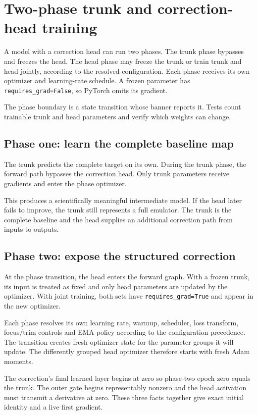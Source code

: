 \documentclass[10pt,aps,prd,twocolumn,nofootinbib]{revtex4-2}
\newcommand{\code}[1]{\texttt{#1}}
\begin{document}
\section{Two-phase trunk and correction-head training}
\label{sec:two-phase}

A model with a correction head can run two phases.  The trunk phase bypasses
and freezes the head.  The head phase may freeze the trunk or train trunk and
head jointly, according to the resolved configuration.  Each phase receives
its own optimizer and learning-rate schedule.  A frozen parameter has
\code{requires\_grad=False}, so PyTorch omits its gradient.

The phase boundary is a state transition whose banner reports it.  Tests count
trainable trunk and head parameters and verify which weights can change.

\subsection{Phase one: learn the complete baseline map}

The trunk predicts the complete target on its own.  During the trunk phase,
the forward path bypasses the correction head.  Only trunk parameters receive
gradients and enter the phase optimizer.

This produces a scientifically meaningful intermediate model.  If the head
later fails to improve, the trunk still represents a full emulator.  The
trunk is the complete baseline and the head supplies an additional correction
path from inputs to outputs.

\subsection{Phase two: expose the structured correction}

At the phase transition, the head enters the forward graph.  With a frozen
trunk, its input is treated as fixed and only head parameters are updated by
the optimizer.
With joint training, both sets have \code{requires\_grad=True} and appear in
the new optimizer.

Each phase resolves its own learning rate, warmup, scheduler, loss transform,
focus/trim controls and EMA policy according to the configuration
precedence.  The transition creates fresh optimizer state for the parameter
groups it will update.  The differently grouped head optimizer therefore
starts with fresh Adam moments.

The correction's final learned layer begins at zero so phase-two epoch zero
equals the trunk.  The outer gate begins representably nonzero and the
head activation must transmit a derivative at zero.  These three facts
together give exact initial identity and a live first gradient.
\end{document}
